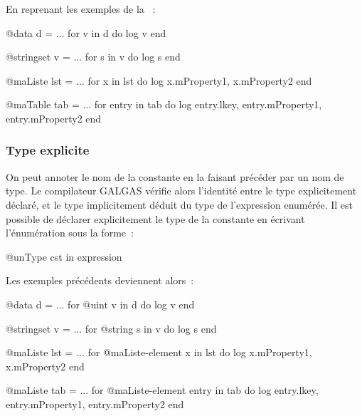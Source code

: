 En reprenant les exemples de la ~:

\begin{galgas}
@data d = ...
for v in d do
  log v
end
\end{galgas}



\begin{galgas}
@stringset v = ...
for s in v do
  log s
end
\end{galgas}


\begin{galgas}
@maListe lst = ...
for x in lst do
  log x.mProperty1, x.mProperty2
end
\end{galgas}


\begin{galgas}
@maTable tab = ...
for entry in tab do
  log entry.lkey, entry.mProperty1, entry.mProperty2
end
\end{galgas}

\subsubsection{Type explicite}

On peut annoter le nom de la constante en la faisant précéder par un nom de type. Le compilateur GALGAS vérifie alors l'identité entre le type explicitement déclaré, et le type implicitement déduit du type de l'expression enumérée. Il est possible de déclarer explicitement le type de la constante en écrivant l'énumération sous la forme~:

\begin{galgas}
@unType cst in expression
\end{galgas}

Les exemples précédents deviennent alors~:

\begin{galgas}
@data d = ...
for @uint v in d do
  log v
end
\end{galgas}



\begin{galgas}
@stringset v = ...
for @string s in v do
  log s
end
\end{galgas}


\begin{galgas}
@maListe lst = ...
for @maListe-element x in lst do
  log x.mProperty1, x.mProperty2
end
\end{galgas}


\begin{galgas}
@maListe tab = ...
for @maListe-element entry in tab do
  log entry.lkey, entry.mProperty1, entry.mProperty2
end
\end{galgas}



